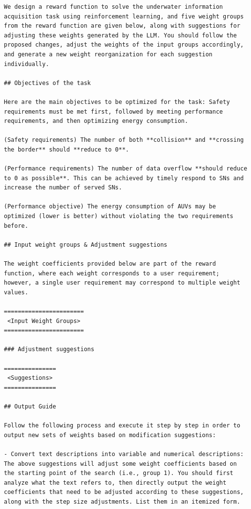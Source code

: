 \documentclass{article}
\begin{document}
\begin{verbatim}
We design a reward function to solve the underwater information acquisition task using reinforcement learning, and five weight groups from the reward function are given below, along with suggestions for adjusting these weights generated by the LLM. You should follow the proposed changes, adjust the weights of the input groups accordingly, and generate a new weight reorganization for each suggestion individually.

## Objectives of the task

Here are the main objectives to be optimized for the task: Safety requirements must be met first, followed by meeting performance requirements, and then optimizing energy consumption.

(Safety requirements) The number of both **collision** and **crossing the border** should **reduce to 0**.

(Performance requirements) The number of data overflow **should reduce to 0 as possible**. This can be achieved by timely respond to SNs and increase the number of served SNs.

(Performance objective) The energy consumption of AUVs may be optimized (lower is better) without violating the two requirements before.

## Input weight groups & Adjustment suggestions

The weight coefficients provided below are part of the reward function, where each weight corresponds to a user requirement; however, a single user requirement may correspond to multiple weight values.

=======================
 <Input Weight Groups>
=======================

### Adjustment suggestions

===============
 <Suggestions>
===============

## Output Guide

Follow the following process and execute it step by step in order to output new sets of weights based on modification suggestions:

- Convert text descriptions into variable and numerical descriptions: The above suggestions will adjust some weight coefficients based on the starting point of the search (i.e., group 1). You should first analyze what the text refers to, then directly output the weight coefficients that need to be adjusted according to these suggestions, along with the step size adjustments. List them in an itemized form.


\end{verbatim}
\end{document}
